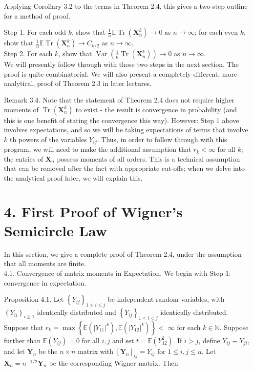 \documentclass[10pt]{article}
\begin{document}
Applying Corollary 3.2 to the terms in Theorem 2.4, this gives a two-step outline for a method of proof.

Step 1. For each odd $k$, show that $\frac{1}{n} \mathbb{E} \operatorname{Tr}\left(\mathbf{X}_{n}^{k}\right) \rightarrow 0$ as $n \rightarrow \infty$; for each even $k$, show that $\frac{1}{n} \mathbb{E} \operatorname{Tr}\left(\mathbf{X}_{n}^{k}\right) \rightarrow C_{k / 2}$ as $n \rightarrow \infty$.\\
Step 2. For each $k$, show that $\operatorname{Var}\left(\frac{1}{n} \operatorname{Tr}\left(\mathbf{X}_{n}^{k}\right)\right) \rightarrow 0$ as $n \rightarrow \infty$.\\
We will presently follow through with those two steps in the next section. The proof is quite combinatorial. We will also present a completely different, more analytical, proof of Theorem 2.3 in later lectures.

Remark 3.4. Note that the statement of Theorem 2.4 does not require higher moments of $\operatorname{Tr}\left(\mathbf{X}_{n}^{k}\right)$ to exist - the result is convergence in probability (and this is one benefit of stating the convergence this way). However: Step 1 above involves expectations, and so we will be taking expectations of terms that involve $k$ th powers of the variables $Y_{i j}$. Thus, in order to follow through with this program, we will need to make the additional assumption that $r_{k}<\infty$ for all $k$; the entries of $\mathbf{X}_{n}$ possess moments of all orders. This is a technical assumption that can be removed after the fact with appropriate cut-offs; when we delve into the analytical proof later, we will explain this.

\section*{4. First Proof of Wigner's Semicircle Law}
In this section, we give a complete proof of Theorem 2.4, under the assumption that all moments are finite.\\
4.1. Convergence of matrix moments in Expectation. We begin with Step 1: convergence in expectation.

Proposition 4.1. Let $\left\{Y_{i j}\right\}_{1 \leq i \leq j}$ be independent random variables, with $\left\{Y_{i i}\right\}_{i \geq 1}$ identically distributed and $\left\{Y_{i j}\right\}_{1 \leq i<j}$ identically distributed. Suppose that $r_{k}=\max \left\{\mathbb{E}\left(\left|Y_{11}\right|^{k}\right), \mathbb{E}\left(\left|Y_{12}\right|^{k}\right)\right\}<$ $\infty$ for each $k \in \mathbb{N}$. Suppose further than $\mathbb{E}\left(Y_{i j}\right)=0$ for all $i, j$ and set $t=\mathbb{E}\left(Y_{12}^{2}\right)$. If $i>j$, define $Y_{i j} \equiv Y_{j i}$, and let $\mathbf{Y}_{n}$ be the $n \times n$ matrix with $\left[\mathbf{Y}_{n}\right]_{i j}=Y_{i j}$ for $1 \leq i, j \leq n$. Let $\mathbf{X}_{n}=n^{-1 / 2} \mathbf{Y}_{n}$ be the corresponding Wigner matrix. Then
\end{document}
